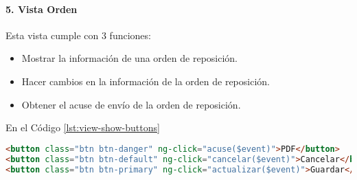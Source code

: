 \paragraph{5. Vista Orden\\}
Esta vista cumple con 3 funciones:
\begin{itemize}
	\item Mostrar la información de una orden de reposición.
	\item Hacer cambios en la información de la orden de reposición.
	\item Obtener el acuse de envío de la orden de reposición.
\end{itemize}
En el Código \ref{lst:view-show-buttons}
\begin{lstlisting}[language=HTML, captionpos=b, caption={Controles de la vista de orden de reposición.}, label={lst:view-show-buttons}]
<button class="btn btn-danger" ng-click="acuse($event)">PDF</button>
<button class="btn btn-default" ng-click="cancelar($event)">Cancelar</button>
<button class="btn btn-primary" ng-click="actualizar($event)">Guardar</button>
\end{lstlisting}

